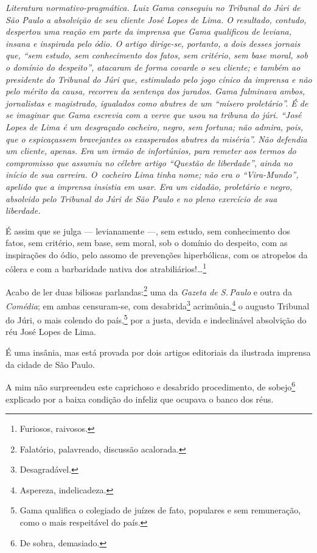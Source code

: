 {\begin{resumo}
\emph{Literatura normativo-pragmática. Luiz Gama conseguiu no Tribunal
do Júri de São Paulo a absolvição de seu cliente José Lopes de Lima. O
resultado, contudo, despertou uma reação em parte da imprensa que Gama
qualificou de leviana, insana e inspirada pelo ódio. O artigo
dirige-se, portanto, a dois desses jornais que, ``sem estudo, sem
conhecimento dos fatos, sem critério, sem base moral, sob o domínio do
despeito'', atacaram de forma covarde o seu cliente; e também ao
presidente do Tribunal do Júri que, estimulado pelo jogo cínico da
imprensa e não pelo mérito da causa, recorreu da sentença dos jurados.
Gama fulminava ambos, jornalistas e magistrado, igualados como abutres
de um ``mísero proletário''. É de se imaginar que Gama escrevia com a
verve que usou na tribuna do júri. ``José Lopes de Lima é um desgraçado
cocheiro, negro, sem fortuna; não admira, pois, que o espicaçassem
bravejantes os exasperados abutres da miséria''. Não defendia um cliente,
apenas. Era um irmão de infortúnios, para remeter aos termos do
compromisso que assumiu no célebre artigo ``Questão de liberdade'', ainda no início de sua carreira. O~cocheiro Lima tinha nome; não era o ``Vira-Mundo'', apelido que a imprensa insistia em usar. Era um
cidadão, proletário e negro, absolvido pelo Tribunal do Júri de São
Paulo e no pleno exercício de sua liberdade. }
\end{resumo}

É assim que se julga --- levianamente ---, sem estudo, sem
conhecimento dos fatos, sem critério, sem base, sem moral, sob o domínio
do despeito, com as inspirações do ódio, pelo assomo de prevenções
hiperbólicas, com os atropelos da cólera e com a barbaridade nativa dos
atrabiliários!\ldots{}\footnote{Furiosos, raivosos.}

Acabo de ler duas biliosas parlandas:\footnote{Falatório, palavreado,
  discussão acalorada.} uma da \textit{Gazeta de S.\,Paulo} e outra da
\textit{Comédia}; em ambas censuram-se, com desabrida\footnote{
  Desagradável.} acrimônia,\footnote{Aspereza, indelicadeza.} o
augusto Tribunal do Júri, o mais colendo do país,\footnote{Gama
  qualifica o colegiado de juízes de fato, populares e sem remuneração,
  como o mais respeitável do país.} por a justa, devida e indeclinável
absolvição do réu José Lopes de Lima.

É uma insânia, mas está provada por dois artigos editoriais da ilustrada
imprensa da cidade de São Paulo.

A mim não surpreendeu este caprichoso e desabrido procedimento, de
sobejo\footnote{De sobra, demasiado.} explicado por a baixa condição
do infeliz que ocupava o banco dos réus.

}
